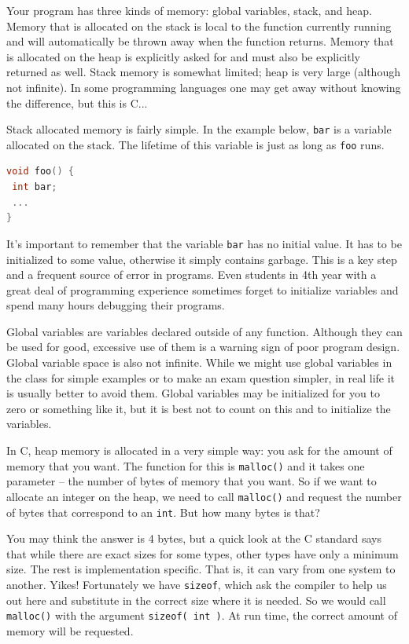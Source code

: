 Your program has three kinds of memory: global variables, stack, and heap. Memory that is allocated on the stack is local to the function currently running and will automatically be thrown away when the function returns. Memory that is allocated on the heap is explicitly asked for and must also be explicitly returned as well. Stack memory is somewhat limited; heap is very large (although not infinite). In some programming languages one may get away without knowing the difference, but this is C...

Stack allocated memory is fairly simple. In the example below, \texttt{bar} is a variable allocated on the stack. The lifetime of this variable is just as long as \texttt{foo} runs.

\begin{lstlisting}[language=C]
void foo() {
 int bar;
 ...
}
\end{lstlisting}

It's important to remember that the variable \texttt{bar} has no initial value. It has to be initialized to some value, otherwise it simply contains garbage. This is a key step and a frequent source of error in programs. Even students in 4th year with a great deal of programming experience sometimes forget to initialize variables and spend many hours debugging their programs.

Global variables are variables declared outside of any function. Although they can be used for good, excessive use of them is a warning sign of poor program design. Global variable space is also not infinite. While we might use global variables in the class for simple examples or to make an exam question simpler, in real life it is usually better to avoid them. Global variables may be initialized for you to zero or something like it, but it is best not to count on this and to initialize the variables.

In C, heap memory is allocated in a very simple way: you ask for the amount of memory that you want. The function for this is \texttt{malloc()} and it takes one parameter -- the number of bytes of memory that you want. So if we want to allocate an integer on the heap, we need to call \texttt{malloc()} and request the number of bytes that correspond to an \texttt{int}. But how many bytes is that?

You may think the answer is 4 bytes, but a quick look at the C standard says that while there are exact sizes for some types, other types have only a minimum size. The rest is implementation specific. That is, it can vary from one system to another. Yikes! Fortunately we have \texttt{sizeof}, which ask the compiler to help us out here and substitute in the correct size where it is needed. So we would call \texttt{malloc()} with the argument \texttt{sizeof( int )}. At run time, the correct amount of memory will be requested.

